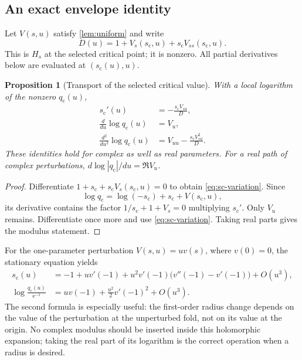 \documentclass[11pt,a4paper]{article}
\numberwithin{equation}{section}
\newtheorem{proposition}[proposition]{Proposition}
\theoremstyle{definition}
\theoremstyle{remark}
\newcommand{\e}{\mathrm e}
\newcommand{\scv}{s_{\mathrm c}}
\newcommand{\qcv}{q_{\mathrm c}}
\begin{document}
\subsection{An exact envelope identity}
Let $V(s,u)$ satisfy \cref{lem:uniform} and write
\[
 D(u)=1+V_s(\scv,u)+\scv V_{ss}(\scv,u).
\]
This is $H_s$ at the selected critical point; it is nonzero. All partial derivatives below are evaluated at $(\scv(u),u)$.

\begin{proposition}[Transport of the selected critical value]
\label{prop:envelope}
With a local logarithm of the nonzero $\qcv(u)$,
\begin{align}
 \scv'(u)&=-\frac{\scv V_{su}}{D},\label{eq:sc-variation}\\
 \frac{d}{du}\log\qcv(u)&=V_u,\label{eq:qc-envelope}\\
 \frac{d^2}{du^2}\log\qcv(u)&=V_{uu}
                         -\frac{\scv V_{su}^2}{D}.
 \label{eq:qc-second}
\end{align}
These identities hold for complex as well as real parameters. For a real path of complex perturbations, $d\log|\qcv|/du=\Re V_u$.
\end{proposition}
\begin{proof}
Differentiate $1+\scv+\scv V_s(\scv,u)=0$ to obtain \eqref{eq:sc-variation}. Since
\[
 \log\qcv=\log(-\scv)+\scv+V(\scv,u),
\]
its derivative contains the factor $1/\scv+1+V_s=0$ multiplying $\scv'$. Only $V_u$ remains. Differentiate once more and use \eqref{eq:sc-variation}. Taking real parts gives the modulus statement.
\end{proof}

For the one-parameter perturbation $V(s,u)=u v(s)$, where $v(0)=0$, the stationary equation yields
\begin{align}
 \scv(u)&=-1+u v'(-1)
       +u^2 v'(-1)\bigl(v''(-1)-v'(-1)\bigr)+O(u^3),\\
 \log\frac{\qcv(u)}{\e^{-1}}
   &=u v(-1)+\frac{u^2}{2}v'(-1)^2+O(u^3).
 \label{eq:qc-smallparameter}
\end{align}
The second formula is especially useful: the first-order radius change depends on the value of the perturbation at the unperturbed fold, not on its value at the origin. No complex modulus should be inserted inside this holomorphic expansion; taking the real part of its logarithm is the correct operation when a radius is desired.
\end{document}
